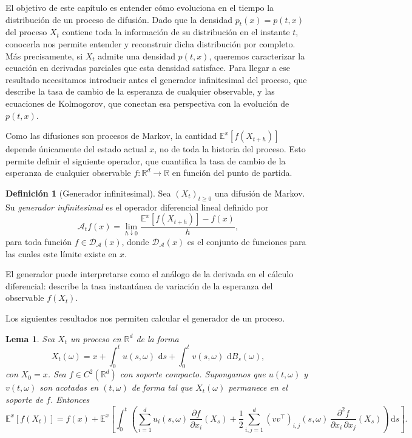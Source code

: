 \documentclass[12pt, a4paper]{report}
\theoremstyle{plain}
\newtheorem{lemma}[theorem]{Lema}
\theoremstyle{definition}
\newtheorem{definition}[theorem]{Definición}
\theoremstyle{remark}
\newcommand{\R}{\mathbb{R}}
\newcommand{\E}{\mathbb{E}}
\newcommand{\dd}{\,\mathrm{d}}
\begin{document}
El objetivo de este capítulo es entender cómo evoluciona en el tiempo la distribución de un proceso de difusión. Dado que la densidad $p_t(x) = p(t,x)$ del proceso $X_t$ contiene toda la información de su distribución en el instante $t$, conocerla nos permite entender y reconstruir dicha distribución por completo. Más precisamente, si $X_t$ admite una densidad $p(t,x)$, queremos caracterizar la ecuación en derivadas parciales que esta densidad satisface. Para llegar a ese resultado necesitamos introducir antes el generador infinitesimal del proceso, que describe la tasa de cambio de la esperanza de cualquier observable, y las ecuaciones de Kolmogorov, que conectan esa perspectiva con la evolución de $p(t,x)$.

Como las difusiones son procesos de Markov, la cantidad $\E^x[f(X_{t+h})]$ depende únicamente del estado actual $x$, no de toda la historia del proceso. Esto permite definir el siguiente operador, que cuantifica la tasa de cambio de la esperanza de cualquier observable $f : \R^d \to \R$ en función del punto de partida.

\begin{definition}[Generador infinitesimal]
\label{def:generador}
Sea $(X_t)_{t \geq 0}$ una difusión de Markov. Su \emph{generador infinitesimal} es el operador diferencial lineal definido por
\[
  \mathcal{A}_{t}f(x) = \lim_{h \downarrow 0} \frac{\E^x[f(X_{t+h})] - f(x)}{h},
\]
para toda función $f \in \mathcal{D}_{\mathcal{A}}(x)$, donde $\mathcal{D}_{\mathcal{A}}(x)$ es el conjunto de funciones para las cuales este límite existe en $x$.
\end{definition}

El generador puede interpretarse como el análogo de la derivada en el cálculo diferencial: describe la tasa instantánea de variación de la esperanza del observable $f(X_t)$.

Los siguientes resultados nos permiten calcular el generador de un proceso.

\begin{lemma}
\label{lem:ito-esperanza}
Sea $X_t$ un proceso en $\R^d$ de la forma
\[
  X_t(\omega) = x + \int_0^t u(s,\omega)\,\dd s + \int_0^t v(s,\omega)\,\dd B_s(\omega),
\]
con $X_0 = x$. Sea $f \in C^2(\R^d)$ con soporte compacto. Supongamos que $u(t,\omega)$ y $v(t,\omega)$ son acotadas en $(t,\omega)$ de forma tal que $X_t(\omega)$ permanece en el soporte de $f$. Entonces
\[
  \E^x[f(X_t)]
  = f(x)
  + \E^x\!\left[\int_0^t \left(
      \sum_{i=1}^{d} u_i(s,\omega)\,\frac{\partial f}{\partial x_i}(X_s)
      + \frac{1}{2}\sum_{i,j=1}^{d} (vv^{\top})_{i,j}(s,\omega)\,
        \frac{\partial^2 f}{\partial x_i\,\partial x_j}(X_s)
    \right)\dd s\right].
\]
\end{lemma}
\end{document}
